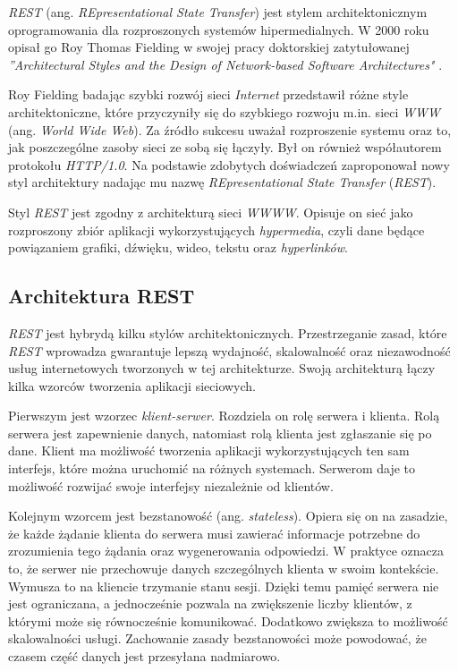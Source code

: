 \textsl{REST} (ang. \textsl{REpresentational State Transfer}) jest stylem architektonicznym oprogramowania dla rozproszonych systemów hipermedialnych. W 2000 roku opisał go Roy Thomas Fielding w swojej pracy doktorskiej zatytułowanej \textsl{''Architectural Styles and the Design of Network-based Software Architectures"} \cite{restinpractice}.

Roy Fielding badając  szybki rozwój sieci \textsl{Internet} przedstawił różne style architektoniczne, które przyczyniły się do szybkiego rozwoju m.in. sieci \textsl{WWW} (ang. \textsl{World Wide Web}). Za źródło sukcesu  uważał rozproszenie systemu oraz to, jak poszczególne zasoby sieci ze sobą się łączyły. Był on również współautorem protokołu \textsl{HTTP/1.0}. Na podstawie zdobytych doświadczeń zaproponował nowy styl  architektury nadając mu nazwę \textsl{REpresentational State Transfer} (\textsl{REST}).  

Styl \textsl{REST} jest  zgodny z architekturą sieci \textsl{WWWW}. Opisuje on sieć jako rozproszony zbiór aplikacji wykorzystujących \textsl{hypermedia}, czyli dane będące powiązaniem grafiki, dźwięku, wideo, tekstu oraz \textsl{hyperlinków}. 

\subsection{Architektura REST}
\textsl{REST} jest hybrydą kilku stylów architektonicznych. Przestrzeganie zasad, które \textsl{REST} wprowadza gwarantuje lepszą wydajność, skalowalność oraz niezawodność usług internetowych tworzonych w tej architekturze. Swoją architekturą łączy kilka wzorców tworzenia aplikacji sieciowych. 

Pierwszym  jest wzorzec \textsl{klient-serwer}. Rozdziela on rolę serwera i klienta. Rolą serwera jest zapewnienie danych, natomiast rolą klienta jest zgłaszanie się po dane. Klient ma możliwość tworzenia aplikacji wykorzystujących ten sam interfejs, które można uruchomić na różnych systemach. Serwerom daje to możliwość rozwijać swoje interfejsy niezależnie od klientów. 

Kolejnym wzorcem jest bezstanowość (ang. \textsl{stateless}). Opiera się on na zasadzie, że każde żądanie klienta do serwera musi zawierać informacje potrzebne do zrozumienia tego żądania oraz wygenerowania odpowiedzi. W praktyce oznacza to, że serwer nie przechowuje danych szczególnych klienta w swoim kontekście. Wymusza to na kliencie trzymanie stanu sesji. Dzięki temu pamięć serwera nie jest ograniczana, a jednocześnie pozwala na zwiększenie liczby klientów, z którymi może się równocześnie komunikować. Dodatkowo zwiększa to możliwość skalowalności usługi. Zachowanie zasady bezstanowości może powodować, że czasem część danych jest przesyłana nadmiarowo.

